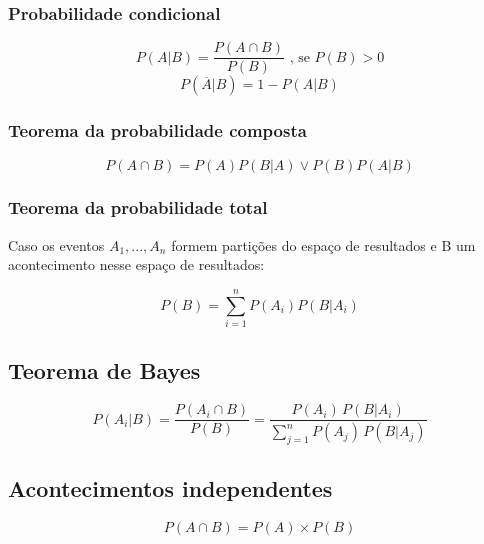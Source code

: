 \documentclass[11pt, a4paper]{article}
\begin{document}
\subsubsection*{Probabilidade condicional}

\begin{equation*}
    P(A|B) = \frac{P(A \cap B)}{P(B)} \text{ , se } P(B) > 0
\end{equation*}
\begin{equation*}
    P(\overline{A}|B) = 1 - P(A|B)
\end{equation*}

\subsubsection*{Teorema da probabilidade composta}

\begin{equation*}
    P(A \cap B) = P(A)P(B|A) \vee P(B)P(A|B)
\end{equation*}

\subsubsection*{Teorema da probabilidade total}

Caso os eventos $A_1, ..., A_n$ formem partições do espaço de resultados e B um acontecimento nesse espaço de resultados:

\begin{equation*}
    P(B) = \sum_{i=1}^{n} P(A_i)P(B|A_i)
\end{equation*}

\subsection{Teorema de Bayes}

\begin{equation*}
    P(A_i|B) = \frac{P(A_i \cap B)}{P(B)}
    = \frac{P(A_i) \, P(B|A_i)}{\sum_{j=1}^{n}P(A_j) \, P(B|A_j)}
\end{equation*}

\subsection{Acontecimentos independentes}


\begin{equation*}
    P(A \cap B) = P(A) \times P(B)
\end{equation*}

\newpage
\end{document}
